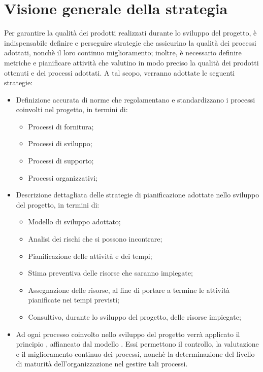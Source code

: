 \documentclass[../PianoDiQualifica.tex]{subfiles}
\begin{document}
	\section{Visione generale della strategia}
	Per garantire la qualità dei prodotti realizzati durante lo sviluppo del progetto, è indispensabile definire e perseguire strategie che assicurino la qualità dei processi adottati, nonchè il loro continuo miglioramento; inoltre, è necessario definire metriche e pianificare attività che valutino in modo preciso la qualità dei prodotti ottenuti e dei processi adottati. A tal scopo, verranno adottate le seguenti strategie:
	\begin{itemize}
	\item Definizione accurata di norme che regolamentano e standardizzano i processi coinvolti nel progetto, in termini di:
		\begin{itemize}
		\item Processi di fornitura;
		\item Processi di sviluppo;
		\item Processi di supporto;
		\item Processi organizzativi;
		\end{itemize}
	\item Descrizione dettagliata delle strategie di pianificazione adottate nello sviluppo del progetto, in termini di:
		\begin{itemize}
		\item Modello di sviluppo adottato;
		\item Analisi dei rischi che si possono incontrare;
		\item Pianificazione delle attività e dei tempi;
		\item Stima preventiva delle risorse che saranno impiegate;
		\item Assegnazione delle risorse, al fine di portare a termine le attività pianificate nei tempi previsti;
		\item Consultivo, durante lo sviluppo del progetto, delle risorse impiegate;
		\end{itemize}
	\item Ad ogni processo coinvolto nello sviluppo del progetto verrà applicato il principio , affiancato dal modello . Essi permettono il controllo, la valutazione e il miglioramento continuo dei processi, nonchè la determinazione del livello di maturità dell'organizzazione nel gestire tali processi.
	\end{itemize}
	
\end{document}
